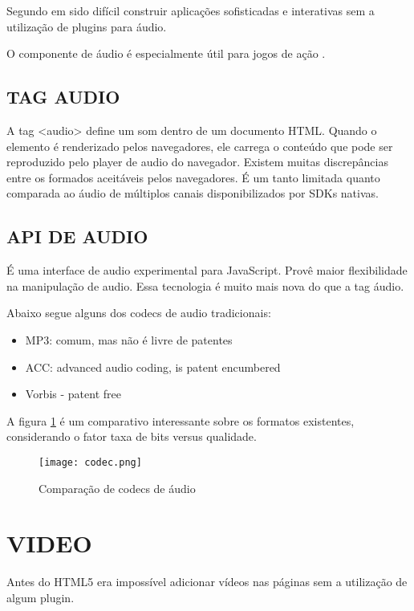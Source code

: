 Segundo \cite{browserGamesTechnologyAndFuture} em sido difícil construir aplicações sofisticadas e interativas sem a utilização de plugins para áudio.

O componente de áudio é especialmente útil para jogos de ação \autocite{browserGamesTechnologyAndFuture}.

\subsection{TAG AUDIO}

A tag <audio> define um som dentro de um documento HTML. Quando o
elemento é renderizado pelos navegadores, ele carrega o conteúdo
que pode ser reproduzido pelo player de audio do navegador. Existem
muitas discrepâncias entre os formados aceitáveis pelos navegadores.
É um tanto limitada quanto comparada ao áudio de múltiplos canais
disponibilizados por SDKs nativas.

\subsection{API DE AUDIO}

É uma interface de audio experimental para JavaScript. Provê maior
flexibilidade na manipulação de audio. Essa tecnologia é muito mais
nova do que a tag áudio.


Abaixo segue alguns dos codecs de audio tradicionais:
\begin{itemize}
    \item{MP3: comum, mas não é livre de patentes}
    \item{ACC: advanced audio coding, is patent encumbered} \item{Vorbis - patent free}
\end{itemize}

A figura \ref{fig:audioCodecs} é um comparativo interessante sobre os formatos existentes, considerando o fator taxa de bits versus qualidade.

\begin{figure}
    \centering
    \texttt{[image: codec.png]}
	\caption{Comparação de codecs de áudio}
    \label{fig:audioCodecs}
\end{figure}



\section{VIDEO}
Antes do HTML5 era impossível adicionar vídeos nas páginas sem a utilização de algum plugin.

